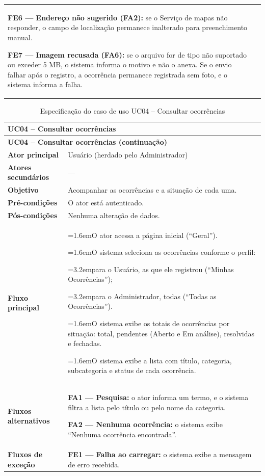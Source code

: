 \documentclass[12pt,a4paper]{article}
\newcommand{\ucitem}[2]{\par\noindent\hangindent=1.6em\hangafter=1\makebox[1.6em][l]{#1}#2}
\newcommand{\ucsubitem}[2]{\par\noindent\hangindent=3.2em\hangafter=1\hspace*{1.6em}\makebox[1.6em][l]{#1}#2}
\begin{document}
\begin{longtable}{|p{}|p{}|}
\par\smallskip\noindent \textbf{FE6 — Endereço não sugerido (FA2):} se o Serviço de mapas não responder, o campo de localização permanece inalterado para preenchimento manual.
\par\smallskip\noindent \textbf{FE7 — Imagem recusada (FA6):} se o arquivo for de tipo não suportado ou exceder 5 MB, o sistema informa o motivo e não o anexa. Se o envio falhar após o registro, a ocorrência permanece registrada sem foto, e o sistema informa a falha. \\ %
\end{longtable}

\begin{longtable}{|p{}|p{}|}
\caption{Especificação do caso de uso UC04 -- Consultar ocorrências}
\label{tab:uc04} \\
\hline
\multicolumn{2}{|l|}{\textbf{UC04 -- Consultar ocorrências}} \\
\hline
\endfirsthead

\hline
\multicolumn{2}{|l|}{\textbf{UC04 -- Consultar ocorrências (continuação)}} \\
\hline
\endhead

\hline
\endfoot
\textbf{Ator principal} & Usuário (herdado pelo Administrador) \\ \hline
\textbf{Atores secundários} & — \\ \hline
\textbf{Objetivo} & Acompanhar as ocorrências e a situação de cada uma. \\ \hline
\textbf{Pré-condições} & O ator está autenticado. \\ \hline
\textbf{Pós-condições} & Nenhuma alteração de dados. \\ \hline
\textbf{Fluxo principal} &
\ucitem{1.}{O ator acessa a página inicial (``Geral'').}
\ucitem{2.}{O sistema seleciona as ocorrências conforme o perfil:}
\ucsubitem{\textbullet}{para o Usuário, as que ele registrou (``Minhas Ocorrências'');}
\ucsubitem{\textbullet}{para o Administrador, todas (``Todas as Ocorrências'').}
\ucitem{3.}{O sistema exibe os totais de ocorrências por situação: total, pendentes (Aberto e Em análise), resolvidas e fechadas.}
\ucitem{4.}{O sistema exibe a lista com título, categoria, subcategoria e status de cada ocorrência.} \\ \hline
\textbf{Fluxos alternativos} &
\noindent \textbf{FA1 — Pesquisa:} o ator informa um termo, e o sistema filtra a lista pelo título ou pelo nome da categoria.
\par\smallskip\noindent \textbf{FA2 — Nenhuma ocorrência:} o sistema exibe ``Nenhuma ocorrência encontrada''. \\ \hline
\textbf{Fluxos de exceção} &
\noindent \textbf{FE1 — Falha ao carregar:} o sistema exibe a mensagem de erro recebida. \\
\end{longtable}
\end{document}

